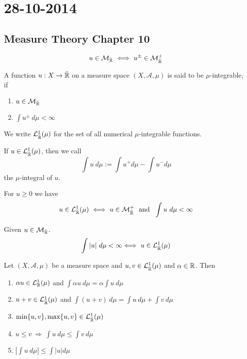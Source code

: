 \section{28-10-2014}
\subsection{Measure Theory Chapter 10}

\begin{prop}
\[
u\in \mathcal{M}_{\bar{\Bbb{R}}}\  \Longleftrightarrow \  u^\pm \in \mathcal{M}_{\bar{\Bbb{R}}}^+
\]
\end{prop}

\begin{defn}
A function \(u:X\rightarrow \bar{\Bbb{R}}\) on a measure space \((X,\mathcal{A},\mu )\) is said to be \(\mu \)-integrable, if

\begin{enumerate}
  \item \(u\in \mathcal{M}_{\bar{\Bbb{R}}}\)
  \item \(\int  u^\pm \  d\mu  <\infty \)
\end{enumerate}

We write \(\mathcal{L}^{1}_{\bar{\Bbb{R}}}(\mu )\) for the set of all numerical \(\mu \)-integrable functions.
\end{defn}

\begin{defn}
If $u\in \mathcal{L}^{1}_{\bar{\Bbb{R}}}(\mu )$, then we call
\[
\int u\  d\mu :=\int u^+d\mu -\int u^- d\mu 
\]
the \(\mu \)-integral of \(u\).
\end{defn}

\begin{prop}
For \(u\geq 0\) we have
\[
u\in \mathcal{L}_{\bar{\Bbb{R}}}^1(\mu )\  \Longleftrightarrow \  u\in \mathcal{M}_{\bar{\Bbb{R}}}^+\  \text{ and }\  \int u\  d\mu <\infty 
\]
\end{prop}

\begin{prop}
Given \(u\in \mathcal{M}_{\bar{\Bbb{R}}}\).
\[
\int  |u|\  d\mu  <\infty  \Longleftrightarrow \  u\in \mathcal{L}_{\bar{\Bbb{R}}}^1(\mu )
\]
\end{prop}
\begin{thm}
Let \((X,\mathcal{A},\mu )\) be a measure space and \(u,v\in \mathcal{L}_{\bar{\Bbb{R}}}^1(\mu )\) and \(\alpha \in \Bbb{R}\). Then

\begin{enumerate}
  \item \(\alpha u \in  \mathcal{L}_{\Bbb{R}}^1(\mu )\) and \(\int \alpha u\  d\mu  = \alpha \int  u\  d\mu \)
  \item \(u+v\in \mathcal{L}_{\bar{\Bbb{R}}}^1(\mu )\) and \(\int (u+v)\  d\mu = \int u\  d\mu + \int v\  d\mu \)
  \item \(\min\{u,v\},\max\{u,v\}\in \mathcal{L}_{\bar{\Bbb{R}}}^1(\mu )\)
  \item \(u\leq v\  \Longrightarrow \  \int u\  d\mu \leq  \int v\  d\mu \)
  \item \(|\int u\  d\mu |\leq \int |u| d\mu \)
\end{enumerate}

\end{thm}

